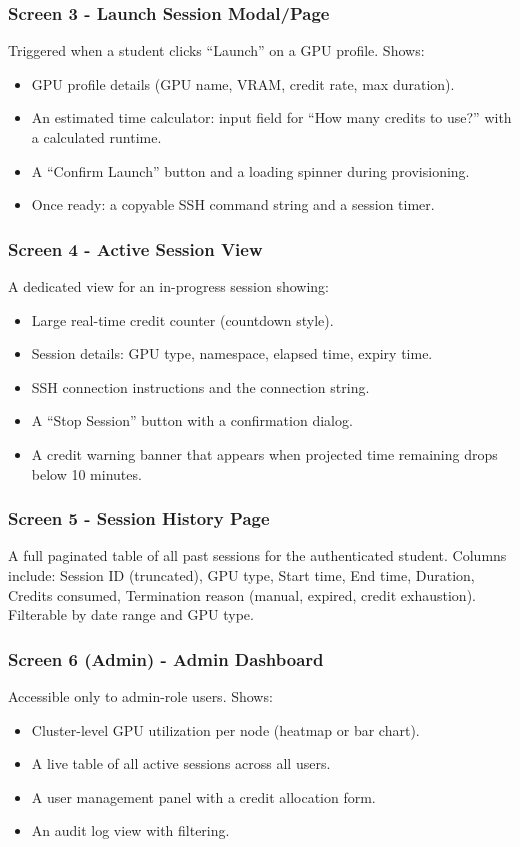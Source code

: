 \documentclass[12pt,a4paper]{article}
\begin{document}
\subsubsection*{Screen 3 - Launch Session Modal/Page}
Triggered when a student clicks ``Launch'' on a GPU profile. Shows:
\begin{itemize}[leftmargin=1.5em, topsep=2pt, itemsep=2pt]
  \item GPU profile details (GPU name, VRAM, credit rate, max duration).
  \item An estimated time calculator: input field for ``How many credits to use?'' with a calculated runtime.
  \item A ``Confirm Launch'' button and a loading spinner during provisioning.
  \item Once ready: a copyable SSH command string and a session timer.
\end{itemize}

\subsubsection*{Screen 4 - Active Session View}
A dedicated view for an in-progress session showing:
\begin{itemize}[leftmargin=1.5em, topsep=2pt, itemsep=2pt]
  \item Large real-time credit counter (countdown style).
  \item Session details: GPU type, namespace, elapsed time, expiry time.
  \item SSH connection instructions and the connection string.
  \item A ``Stop Session'' button with a confirmation dialog.
  \item A credit warning banner that appears when projected time remaining drops below 10 minutes.
\end{itemize}

\subsubsection*{Screen 5 - Session History Page}
A full paginated table of all past sessions for the authenticated student. Columns include: Session ID (truncated), GPU type, Start time, End time, Duration, Credits consumed, Termination reason (manual, expired, credit exhaustion). Filterable by date range and GPU type.

\subsubsection*{Screen 6 (Admin) - Admin Dashboard}
Accessible only to admin-role users. Shows:
\begin{itemize}[leftmargin=1.5em, topsep=2pt, itemsep=2pt]
  \item Cluster-level GPU utilization per node (heatmap or bar chart).
  \item A live table of all active sessions across all users.
  \item A user management panel with a credit allocation form.
  \item An audit log view with filtering.
\end{itemize}
\end{document}
